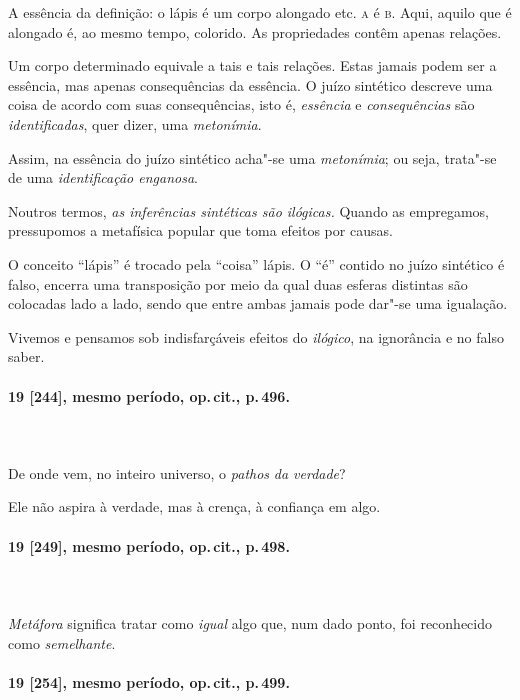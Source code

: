A essência da definição: o lápis é um corpo alongado etc. \textsc{a} é \textsc{b}. Aqui,
aquilo que é alongado é, ao mesmo tempo, colorido. As propriedades
contêm apenas relações.

Um corpo determinado equivale a tais e tais relações. Estas jamais podem
ser a essência, mas apenas consequências da essência. O juízo sintético
descreve uma coisa de acordo com suas consequências, isto é,
\textit{essência} e \textit{consequências} são \textit{identificadas},
quer dizer, uma \textit{metonímia}.

Assim, na essência do juízo sintético acha"-se uma \textit{metonímia};
ou seja, trata"-se de uma \textit{identificação enganosa}.

Noutros termos, \textit{as inferências sintéticas são ilógicas.} Quando
as empregamos, pressupomos a metafísica popular que toma efeitos por
causas.

O conceito “lápis” é trocado pela “coisa” lápis. O “é” contido no juízo
sintético é falso, encerra uma transposição por meio da qual duas
esferas distintas são colocadas lado a lado, sendo que entre ambas
jamais pode dar"-se uma igualação.

Vivemos e pensamos sob indisfarçáveis efeitos do \textit{ilógico}, na
ignorância e no falso saber. 

\pagebreak
\paragraph*{19 [244], mesmo período, op.\,cit., p.\,496.}
\ \\
\ \\

De onde vem, no inteiro universo, o \textit{pathos} \textit{da verdade}?

Ele não aspira à verdade, mas à crença, à confiança em algo.

\pagebreak
\paragraph*{19 [249], mesmo período, op.\,cit., p.\,498.}
\ \\
\ \\

\textit{Metáfora} significa tratar como \textit{igual} algo que, num
dado ponto, foi reconhecido como \textit{semelhante}.

\pagebreak
\paragraph*{19 [254], mesmo período, op.\,cit., p.\,499.}
\ \\
\ \\

